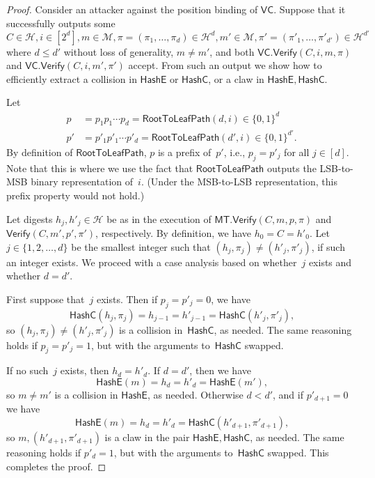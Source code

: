 \documentclass[11pt,hidelinks]{article}
\newcommand{\algo}[1]{\ensuremath{\mathsf{#1}}}
\newcommand{\bit}{\ensuremath{\{0,1\}}}
\newcommand{\msgspace}{\ensuremath{\mathcal{M}}}
\newcommand{\hashsp}{\ensuremath{\mathcal{H}}}
\newcommand{\MT}{\algo{MT}}
\newcommand{\VC}{\algo{VC}}
\newcommand{\Verify}{\algo{Verify}}
\newcommand{\HashEntry}{\algo{HashE}}
\newcommand{\HashChildren}{\algo{HashC}}
\newcommand{\RootToLeafPath}{\algo{RootToLeafPath}}
\begin{document}
\begin{proof}

  Consider an attacker against the position binding of $\VC$. Suppose
  that it successfully outputs some
  $C \in \hashsp, i \in [2^{d}], m \in \msgspace, \pi=(\pi_{1},
  \ldots, \pi_{d}) \in \hashsp^{d}, m' \in \msgspace, \pi'=(\pi'_{1},
  \ldots, \pi'_{d'}) \in \hashsp^{d'}$ where $d \leq d'$ without loss
  of generality, $m \neq m'$, and both $\VC.\Verify(C, i, m, \pi)$ and
  $\VC.\Verify(C, i, m', \pi')$ accept. From such an output we show
  how to efficiently extract a collision in $\HashEntry$ or
  $\HashChildren$, or a claw in $\HashEntry,\HashChildren$.

  Let
  \begin{align*}
    p &= p_{1} p_{1} \cdots p_{d} = \RootToLeafPath(d,i) \in \bit^{d} \\
    p' &= p'_{1} p'_{1} \cdots p'_{d} = \RootToLeafPath(d',i) \in \bit^{d'}
         \text{.}
  \end{align*}
  By definition of \RootToLeafPath, $p$ is a prefix of~$p'$, i.e.,
  $p_{j}=p'_{j}$ for all $j \in [d]$. Note that this is where we use
  the fact that $\RootToLeafPath$ outputs the LSB-to-MSB binary
  representation of~$i$. (Under the MSB-to-LSB representation, this
  prefix property would not hold.)

  Let digests $h_{j}, h'_{j} \in \hashsp$ be as in the execution of
  $\MT.\Verify(C, m, p, \pi)$ and $\Verify(C, m', p', \pi')$,
  respectively.  By definition, we have $h_{0} = C = h'_{0}$.
  Let~$j \in \{1, 2, \ldots, d\}$ be the smallest integer such that
  $(h_{j},\pi_{j}) \neq (h'_{j},\pi'_{j})$, if such an integer
  exists. We proceed with a case analysis based on whether~$j$ exists
  and whether $d=d'$.

  First suppose that~$j$ exists. Then if $p_{j}=p'_{j}=0$, we have
  \[ \HashChildren(h_{j}, \pi_{j}) = h_{j-1} = h'_{j-1} =
    \HashChildren(h'_{j}, \pi'_{j}) \text{,} \] so
  $(h_{j},\pi_{j}) \neq (h'_{j}, \pi'_{j})$ is a collision
  in~$\HashChildren$, as needed. The same reasoning holds if
  $p_{j}=p'_{j}=1$, but with the arguments to~$\HashChildren$ swapped.

  If no such~$j$ exists, then $h_{d}=h'_{d}$. If $d=d'$, then we have
  \[ \HashEntry(m) = h_{d} = h'_{d} = \HashEntry(m') \text{,} \] so
  $m \neq m'$ is a collision in $\HashEntry$, as needed. Otherwise
  $d < d'$, and if $p'_{d+1}=0$ we have
  \[ \HashEntry(m) = h_{d} = h'_{d} = \HashChildren(h'_{d+1},
    \pi'_{d+1}) \text{,} \] so $m, (h'_{d+1},\pi'_{d+1})$ is a claw in
  the pair $\HashEntry, \HashChildren$, as needed. The same reasoning
  holds if $p'_{d}=1$, but with the arguments to~$\HashChildren$
  swapped. This completes the proof.
\end{proof}
\end{document}
